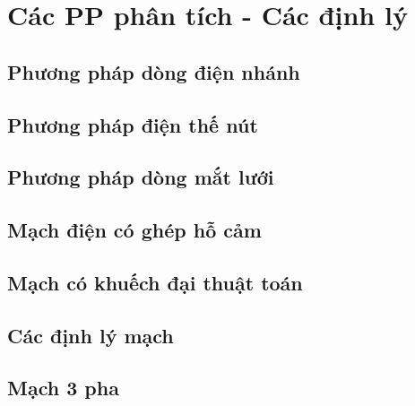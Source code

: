 \section{Các PP phân tích - Các định lý}
\subsection{Phương pháp dòng điện nhánh}
\subsection{Phương pháp điện thế nút}
\subsection{Phương pháp dòng mắt lưới}
\subsection{Mạch điện có ghép hỗ cảm}
\subsection{Mạch có khuếch đại thuật toán}
\subsection{Các định lý mạch}
\subsection{Mạch 3 pha}